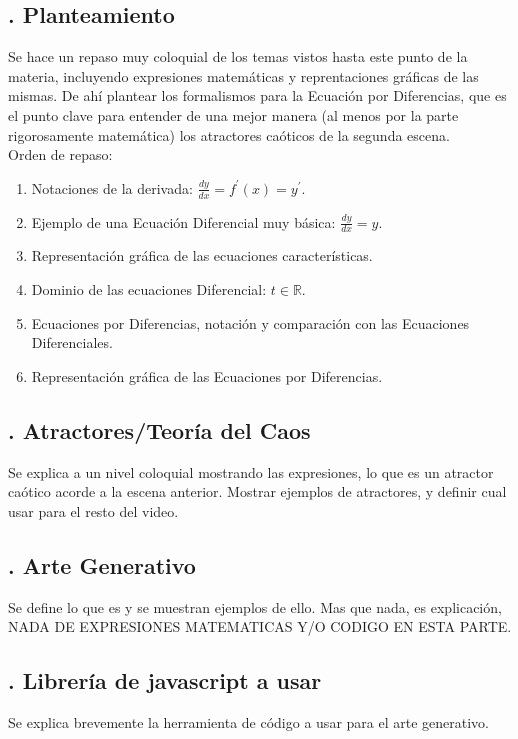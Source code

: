 \documentclass[letterpaper, 12pt]{article}
\begin{document}
\subsection*{{. Planteamiento}} \justify
Se hace un repaso muy coloquial de los temas vistos hasta este punto de la materia, incluyendo expresiones matemáticas y reprentaciones gráficas de las mismas.
De ahí plantear los formalismos para la Ecuación por Diferencias, que es el punto clave para entender de una mejor manera (al menos por la parte rigorosamente matemática) los atractores caóticos
de la segunda escena.
\\\newline
Orden de repaso:
\begin{enumerate}
    \item Notaciones de la derivada: \(\frac{dy}{dx}=f^\prime(x)=y^\prime\).
    \item Ejemplo de una Ecuación Diferencial muy básica: \(\frac{dy}{dx}=y\).
    \item Representación gráfica de las ecuaciones características.
    \item Dominio de las ecuaciones Diferencial: \(t\in\mathbb{R}\).
    \item Ecuaciones por Diferencias, notación y comparación con las Ecuaciones Diferenciales.
    \item Representación gráfica de las Ecuaciones por Diferencias.
\end{enumerate}
\subsection*{{. Atractores/Teoría del Caos}} \justify
Se explica a un nivel coloquial mostrando las expresiones, lo que es un atractor caótico acorde a la escena anterior. Mostrar ejemplos de atractores, y definir cual usar para el resto del video.
\subsection*{{. Arte Generativo}} \justify
Se define lo que es y se muestran ejemplos de ello. Mas que nada, es explicación, NADA DE EXPRESIONES MATEMATICAS Y/O CODIGO EN ESTA PARTE.
\subsection*{{. Librería de javascript a usar}} \justify
Se explica brevemente la herramienta de código a usar para el arte generativo.
\end{document}

